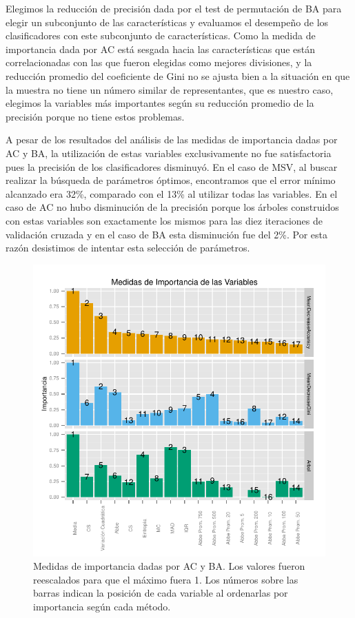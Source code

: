 \documentclass[letterpaper,12pt]{book}
\begin{document}
Elegimos la reducción de precisión dada por el test de permutación de BA para elegir un subconjunto de las características y evaluamos el desempeño de los clasificadores con este subconjunto de características. Como la medida de importancia dada por AC está sesgada hacia las características que están correlacionadas con las que fueron elegidas como mejores divisiones, y la reducción promedio del coeficiente de Gini no se ajusta bien a la situación en que la muestra no tiene un número similar de representantes, que es nuestro caso, elegimos la variables más importantes según su reducción promedio de la precisión porque no tiene estos problemas. 

A pesar de los resultados del análisis de las medidas de importancia dadas por AC y BA, la utilización de estas variables exclusivamente no fue satisfactoria pues la precisión de los clasificadores disminuyó. En el caso de MSV, al buscar realizar la búsqueda de parámetros óptimos, encontramos que el error mínimo alcanzado era 32\%, comparado con el 13\% al utilizar todas las variables. En el caso de AC no hubo disminución de la precisión porque los árboles construidos con estas variables son exactamente los mismos para las diez iteraciones de validación cruzada y en el caso de BA esta disminución fue del 2\%. Por esta razón desistimos de intentar esta selección de parámetros.

\begin{figure}
  \centering
  \includegraphics[width = \textwidth]{./img/CClasificacion/importancias.pdf}
  \caption{Medidas de importancia dadas por AC y BA. Los valores fueron reescalados para que el máximo fuera 1. Los números sobre las barras indican la posición de cada variable al ordenarlas por importancia según cada método.}
  \label{fig:importancias}
  \centering
\end{figure}
\end{document}
